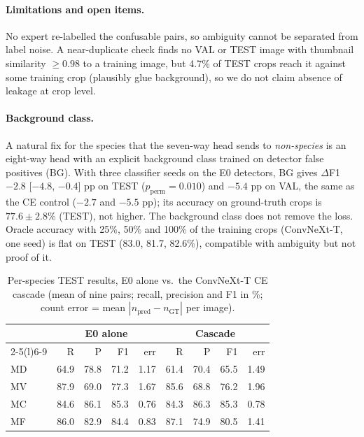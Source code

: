 \paragraph{Limitations and open items.} No expert re-labelled the confusable pairs, so ambiguity cannot be separated from label noise. A near-duplicate check finds no VAL or TEST image with thumbnail similarity $\ge0.98$ to a training image, but 4.7\% of TEST crops reach it against some training crop (plausibly glue background), so we do not claim absence of leakage at crop level. \paragraph{Background class.} A natural fix for the species that the seven-way head sends to \emph{non-species} is an eight-way head with an explicit background class trained on detector false positives (BG). With three classifier seeds on the E0 detectors, BG gives $\Delta$F1 $-2.8$ [$-4.8$, $-0.4$] pp on TEST ($p_{\text{perm}}=0.010$) and $-5.4$ pp on VAL, the same as the CE control ($-2.7$ and $-5.5$ pp); its accuracy on ground-truth crops is $77.6\pm2.8$\% (TEST), not higher. The background class does not remove the loss. Oracle accuracy with 25\%, 50\% and 100\% of the training crops (ConvNeXt-T, one seed) is flat on TEST (83.0, 81.7, 82.6\%), compatible with ambiguity but not proof of it.

\begin{table}[t]
\centering
\caption{Per-species TEST results, E0 alone vs.\ the ConvNeXt-T CE cascade (mean of nine pairs; recall, precision and F1 in \%; count error = mean $|n_{\text{pred}}-n_{\text{GT}}|$ per image).}
\label{tab:persp}
\footnotesize
\setlength{\tabcolsep}{3pt}
\begin{tabular}{@{}lrrrrrrrr@{}}
\toprule
 & \multicolumn{4}{c}{E0 alone} & \multicolumn{4}{c}{Cascade} \\
\cmidrule(r){2-5}\cmidrule(l){6-9}
 & R & P & F1 & err & R & P & F1 & err \\
\midrule
MD & 64.9 & 78.8 & 71.2 & 1.17 & 61.4 & 70.4 & 65.5 & 1.49 \\
MV & 87.9 & 69.0 & 77.3 & 1.67 & 85.6 & 68.8 & 76.2 & 1.96 \\
MC & 84.6 & 86.1 & 85.3 & 0.76 & 84.3 & 86.3 & 85.3 & 0.78 \\
MF & 86.0 & 82.9 & 84.4 & 0.83 & 87.1 & 74.9 & 80.5 & 1.41 \\
\bottomrule
\end{tabular}
\end{table}

